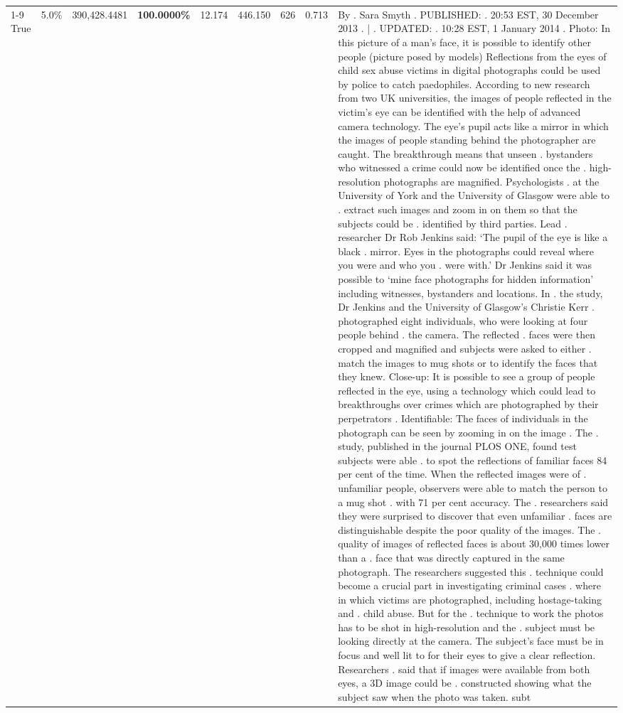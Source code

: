 \begin{table}[H]
\begin{tabular}{lllrlllll}
\cline{1-9}
True & 5.0\% & 390,428.4481 & \bfseries \color{red} 100.0000\% & 12.174 & 446.150 & 626 & 0.713 & By . Sara Smyth . PUBLISHED: . 20:53 EST, 30 December 2013 . | . UPDATED: . 10:28 EST, 1 January 2014 . Photo: In this picture of a man's face, it is possible to identify other people (picture posed by models) Reflections from the eyes of child sex abuse victims in digital photographs could be used by police to catch paedophiles. According to new research from two UK universities, the images of people reflected in the victim's eye can be identified with the help of advanced camera technology. The eye's pupil acts like a mirror in which the images of people standing behind the photographer are caught. The breakthrough means that unseen . bystanders who witnessed a crime could now be identified once the . high-resolution photographs are magnified. Psychologists . at the University of York and the University of Glasgow were able to . extract such images and zoom in on them so that the subjects could be . identified by third parties. Lead . researcher Dr Rob Jenkins said: ‘The pupil of the eye is like a black . mirror. Eyes in the photographs could reveal where you were and who you . were with.' Dr Jenkins said it was possible to ‘mine face photographs for hidden information' including witnesses, bystanders and locations. In . the study, Dr Jenkins and the University of Glasgow's Christie Kerr . photographed eight individuals, who were looking at four people behind . the camera. The reflected . faces were then cropped and magnified and subjects were asked to either . match the images to mug shots or to identify the faces that they knew. Close-up: It is possible to see a group of people reflected in the eye, using a technology which could lead to breakthroughs over crimes which are photographed by their perpetrators . Identifiable: The faces of individuals in the photograph can be seen by zooming in on the image . The . study, published in the journal PLOS ONE, found test subjects were able . to spot the reflections of familiar faces 84 per cent of the time. When the reflected images were of . unfamiliar people, observers were able to match the person to a mug shot . with 71 per cent accuracy. The . researchers said they were surprised to discover that even unfamiliar . faces are distinguishable despite the poor quality of the images. The . quality of images of reflected faces is about 30,000 times lower than a . face that was directly captured in the same photograph. The researchers suggested this . technique could become a crucial part in investigating criminal cases . where in which victims are photographed, including hostage-taking and . child abuse. But for the . technique to work the photos has to be shot in high-resolution and the . subject must be looking directly at the camera. The subject's face must be in focus and well lit to for their eyes to give a clear reflection. Researchers . said that if images were available from both eyes, a 3D image could be . constructed showing what the subject saw when the photo was taken. subt \\

\end{tabular}
\end{table}
